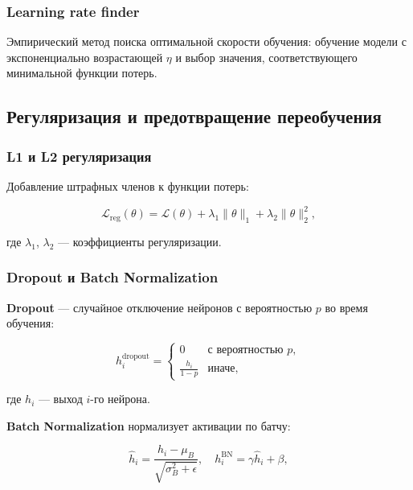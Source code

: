 \subsubsection{Learning rate finder}

Эмпирический метод поиска оптимальной скорости обучения: обучение модели с экспоненциально возрастающей $\eta$ и выбор значения, соответствующего минимальной функции потерь.

\subsection{Регуляризация и предотвращение переобучения}

\subsubsection{L1 и L2 регуляризация}

Добавление штрафных членов к функции потерь:

\begin{equation}
\mathcal{L}_{\text{reg}}(\theta) = \mathcal{L}(\theta) + \lambda_1 \|\theta\|_1 + \lambda_2 \|\theta\|_2^2,
\end{equation}

где $\lambda_1$, $\lambda_2$ — коэффициенты регуляризации.

\subsubsection{Dropout и Batch Normalization}

\textbf{Dropout} — случайное отключение нейронов с вероятностью $p$ во время обучения:

\begin{equation}
h_i^{\text{dropout}} = \begin{cases}
0 & \text{с вероятностью } p, \\
\frac{h_i}{1-p} & \text{иначе},
\end{cases}
\end{equation}

где $h_i$ — выход $i$-го нейрона.

\textbf{Batch Normalization} нормализует активации по батчу:

\begin{equation}
\hat{h}_i = \frac{h_i - \mu_B}{\sqrt{\sigma_B^2 + \epsilon}}, \quad h_i^{\text{BN}} = \gamma \hat{h}_i + \beta,
\end{equation}

